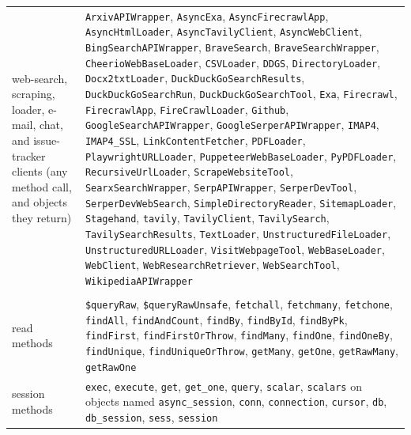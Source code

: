 {\begin{longtable}{@{}>{\raggedright\arraybackslash}p{}>{\raggedright\arraybackslash}p{}@{}}
web-search, scraping, loader, e-mail, chat, and issue-tracker clients (any method call, and objects they return) & \texttt{ArxivAPIWrapper}, \texttt{AsyncExa}, \texttt{AsyncFirecrawlApp}, \texttt{AsyncHtmlLoader}, \texttt{AsyncTavilyClient}, \texttt{AsyncWebClient}, \texttt{BingSearchAPIWrapper}, \texttt{BraveSearch}, \texttt{BraveSearchWrapper}, \texttt{CheerioWebBaseLoader}, \texttt{CSVLoader}, \texttt{DDGS}, \texttt{DirectoryLoader}, \texttt{Docx2txtLoader}, \texttt{DuckDuckGoSearchResults}, \texttt{DuckDuckGoSearchRun}, \texttt{DuckDuckGoSearchTool}, \texttt{Exa}, \texttt{Firecrawl}, \texttt{FirecrawlApp}, \texttt{FireCrawlLoader}, \texttt{Github}, \texttt{GoogleSearchAPIWrapper}, \texttt{GoogleSerperAPIWrapper}, \texttt{IMAP4}, \texttt{IMAP4\_SSL}, \texttt{LinkContentFetcher}, \texttt{PDFLoader}, \texttt{PlaywrightURLLoader}, \texttt{PuppeteerWebBaseLoader}, \texttt{PyPDFLoader}, \texttt{RecursiveUrlLoader}, \texttt{ScrapeWebsiteTool}, \texttt{SearxSearchWrapper}, \texttt{SerpAPIWrapper}, \texttt{SerperDevTool}, \texttt{SerperDevWebSearch}, \texttt{SimpleDirectoryReader}, \texttt{SitemapLoader}, \texttt{Stagehand}, \texttt{tavily}, \texttt{TavilyClient}, \texttt{TavilySearch}, \texttt{TavilySearchResults}, \texttt{TextLoader}, \texttt{UnstructuredFileLoader}, \texttt{UnstructuredURLLoader}, \texttt{VisitWebpageTool}, \texttt{WebBaseLoader}, \texttt{WebClient}, \texttt{WebResearchRetriever}, \texttt{WebSearchTool}, \texttt{WikipediaAPIWrapper} \\
\addlinespace[3pt]\multicolumn{2}{@{}l}{\emph{database (whoever wrote the data)}} \\
read methods & \texttt{\$queryRaw}, \texttt{\$queryRawUnsafe}, \texttt{fetchall}, \texttt{fetchmany}, \texttt{fetchone}, \texttt{findAll}, \texttt{findAndCount}, \texttt{findBy}, \texttt{findById}, \texttt{findByPk}, \texttt{findFirst}, \texttt{findFirstOrThrow}, \texttt{findMany}, \texttt{findOne}, \texttt{findOneBy}, \texttt{findUnique}, \texttt{findUniqueOrThrow}, \texttt{getMany}, \texttt{getOne}, \texttt{getRawMany}, \texttt{getRawOne} \\
session methods & \texttt{exec}, \texttt{execute}, \texttt{get}, \texttt{get\_one}, \texttt{query}, \texttt{scalar}, \texttt{scalars} on objects named \texttt{async\_session}, \texttt{conn}, \texttt{connection}, \texttt{cursor}, \texttt{db}, \texttt{db\_session}, \texttt{sess}, \texttt{session} \\

\end{longtable}}
